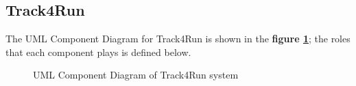 \subsection{Track4Run}

The UML Component Diagram for Track4Run is shown in the \textbf{figure \ref{fig:T4R-component}}; the roles that each component plays is defined below.

\begin{figure}[H]
    \centering
    \caption{UML Component Diagram of Track4Run system}
    \label{fig:T4R-component}
\end{figure}

